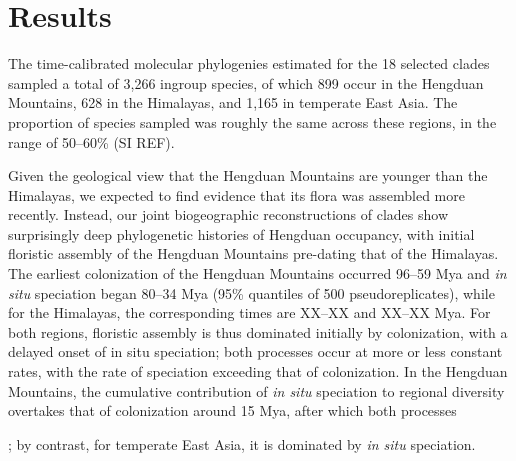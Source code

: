 \section{Results}

The time-calibrated molecular phylogenies estimated for the 18 selected clades sampled a total of 3,266 ingroup species, of which 899 occur in the Hengduan Mountains, 628 in the Himalayas, and 1,165 in temperate East Asia. The proportion of species sampled was roughly the same across these regions, in the range of 50--60\% (SI REF).

Given the geological view that the Hengduan Mountains are younger than the Himalayas, we expected to find evidence that its flora was assembled more recently. Instead, our joint biogeographic reconstructions of clades show surprisingly deep phylogenetic histories of Hengduan occupancy, with initial floristic assembly of the Hengduan Mountains pre-dating that of the Himalayas. The earliest colonization of the Hengduan Mountains occurred 96--59 Mya and \textit{in situ} speciation began 80--34 Mya (95\% quantiles of 500 pseudoreplicates), while for the Himalayas, the corresponding times are XX--XX and XX--XX Mya. For both regions, floristic assembly is thus dominated initially by colonization, with a delayed onset of in situ speciation; both processes occur at more or less constant rates, with the rate of speciation exceeding that of colonization. In the Hengduan Mountains, the cumulative contribution of \textit{in situ} speciation to regional diversity overtakes that of colonization around 15 Mya, after which both processes 

; by contrast, for temperate East Asia, it is dominated by \textit{in situ} speciation. 